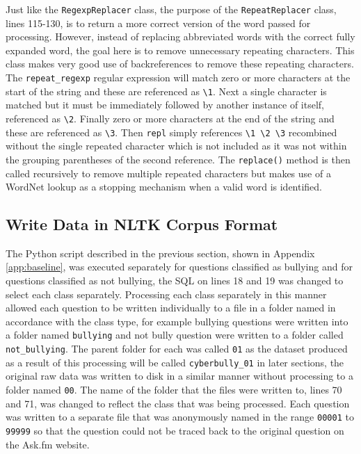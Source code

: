 Just like the \verb|RegexpReplacer| class, the purpose of the \verb|RepeatReplacer| class, lines 115-130, is to return a more correct version of the word passed for processing. However, instead of replacing abbreviated words with the correct fully expanded word, the goal here is to remove unnecessary repeating characters. This class makes very good use of backreferences to remove these repeating characters. The \verb|repeat_regexp| regular expression will match zero or more characters at the start of the string and these are referenced as \verb|\1|. Next a single character is matched but it must be immediately followed by another instance of itself, referenced as \verb|\2|. Finally zero or more characters at the end of the string and these are referenced as \verb|\3|. Then \verb|repl| simply references \verb|\1 \2 \3| recombined without the single repeated character which is not included as it was not within the grouping parentheses of the second reference. The \verb|replace()| method is then called recursively to remove multiple repeated characters but makes use of a WordNet lookup as a stopping mechanism when a valid word is identified.

\subsection{Write Data in NLTK Corpus Format}

The Python script described in the previous section, shown in Appendix \ref{app:baseline}, was executed separately for questions classified as bullying and for questions classified as not bullying, the SQL on lines 18 and 19 was changed to select each class separately. Processing each class separately in this manner allowed each question to be written individually to a file in a folder named in accordance with the class type, for example bullying questions were written into a folder named \verb|bullying| and not bully question were written to a folder called \verb|not_bullying|. The parent folder for each was called \verb|01| as the dataset produced as a result of this processing will be called \verb|cyberbully_01| in later sections, the original raw data was written to disk in a similar manner without processing to a folder named \verb|00|. The name of the folder that the files were written to, lines 70 and 71, was changed to reflect the class that was being processed. Each question was written to a separate file that was anonymously named in the range \verb|00001| to \verb|99999| so that the question could not be traced back to the original question on the Ask.fm website. 

